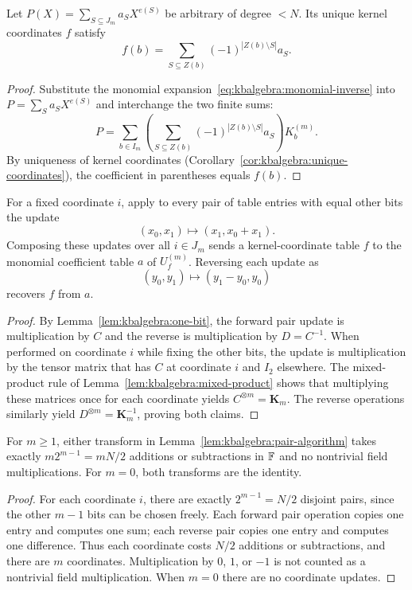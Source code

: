 \begin{proposition}\label{prop:kbalgebra:inverse}
Let $P(X)=\sum_{S\subseteq J_m}a_S X^{e(S)}$ be arbitrary of degree $<N$. Its unique kernel coordinates $f$ satisfy
\begin{equation}\label{eq:kbalgebra:inverse}
 \boxed{f(b)=\sum_{S\subseteq Z(b)}(-1)^{|Z(b)\setminus S|}a_S.}
\end{equation}
\end{proposition}
\begin{proof}
Substitute the monomial expansion~\eqref{eq:kbalgebra:monomial-inverse} into $P=\sum_Sa_SX^{e(S)}$ and interchange the two finite sums:
\[
 P=\sum_{b\in I_m}\left(\sum_{S\subseteq Z(b)}(-1)^{|Z(b)\setminus S|}a_S\right)K_b^{(m)}.
\]
By uniqueness of kernel coordinates (Corollary~\ref{cor:kbalgebra:unique-coordinates}), the coefficient in parentheses equals $f(b)$.
\end{proof}

\begin{lemma}\label{lem:kbalgebra:pair-algorithm}
For a fixed coordinate $i$, apply to every pair of table entries with equal other bits the update
\[
 (x_0,x_1)\longmapsto(x_1,x_0+x_1).
\]
Composing these updates over all $i\in J_m$ sends a kernel-coordinate table $f$ to the monomial coefficient table $a$ of $U_f^{(m)}$. Reversing each update as
\[
 (y_0,y_1)\longmapsto(y_1-y_0,y_0)
\]
recovers $f$ from $a$.
\end{lemma}
\begin{proof}
By Lemma~\ref{lem:kbalgebra:one-bit}, the forward pair update is multiplication by $C$ and the reverse is multiplication by $D=C^{-1}$. When performed on coordinate $i$ while fixing the other bits, the update is multiplication by the tensor matrix that has $C$ at coordinate $i$ and $I_2$ elsewhere. The mixed-product rule of Lemma~\ref{lem:kbalgebra:mixed-product} shows that multiplying these matrices once for each coordinate yields $C^{\otimes m}=\mathbf K_m$. The reverse operations similarly yield $D^{\otimes m}=\mathbf K_m^{-1}$, proving both claims.
\end{proof}

\begin{corollary}\label{cor:kbalgebra:transform-cost}
For $m\geq1$, either transform in Lemma~\ref{lem:kbalgebra:pair-algorithm} takes exactly $m2^{m-1}=mN/2$ additions or subtractions in $\mathbb{F}$ and no nontrivial field multiplications. For $m=0$, both transforms are the identity.
\end{corollary}
\begin{proof}
For each coordinate $i$, there are exactly $2^{m-1}=N/2$ disjoint pairs, since the other $m-1$ bits can be chosen freely. Each forward pair operation copies one entry and computes one sum; each reverse pair copies one entry and computes one difference. Thus each coordinate costs $N/2$ additions or subtractions, and there are $m$ coordinates. Multiplication by $0$, $1$, or $-1$ is not counted as a nontrivial field multiplication. When $m=0$ there are no coordinate updates.
\end{proof}

